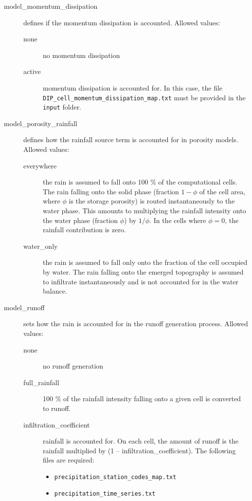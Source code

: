 \begin{description}
\item[model\_momentum\_dissipation] defines if the momentum dissipation is accounted. Allowed values:
\begin{description}
    \item[none] no momentum dissipation
    \item[active] momentum dissipation is accounted for. In this case, the file \texttt{DIP\_cell\_momentum\_dissipation\_map.txt} must be provided in the \texttt{input} folder.
\end{description}
%
%
\item [model\_porosity\_rainfall]  
defines how the rainfall source term is accounted for in porosity models. Allowed values:
\begin{description}
	\item [everywhere] the rain is assumed to fall onto 100 \% of the computational cells. The rain falling onto the solid phase (fraction $1 - \phi$ of the cell area, where $\phi$ is the storage porosity) is routed instantaneously to the water phase. This amounts to multiplying the rainfall intensity onto the water phase (fraction $\phi$) by $1/\phi$. In the cells where $\phi = 0$, the rainfall contribution is zero.
	\item [water\_only] the rain is assumed to fall only onto the fraction of the cell occupied by water. The rain falling onto the emerged topography is assumed to infiltrate instantaneously and is not accounted for in the water balance.
\end{description}
%
\item[model\_runoff] 
sets how the rain is accounted for in the runoff generation process. Allowed values:
\begin{description}
    \item [none] no runoff generation
    \item [full\_rainfall] 100 \% of the rainfall intensity falling onto a given cell is converted to runoff.
    \item[infiltration\_coefficient] rainfall is accounted for. On each cell, the amount of runoff is the rainfall multiplied by (1 -- infiltration\_coefficient). The following files are required:
    \begin{itemize}
    	\item \texttt{precipitation\_station\_codes\_map.txt}
    	\item \texttt{precipitation\_time\_series.txt}

\end{itemize}
\end{description}
\end{description}
